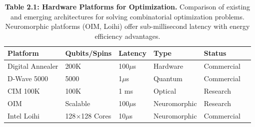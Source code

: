 \begin{table}[H]
\centering
\caption{\textbf{Table 2.1: Hardware Platforms for Optimization.} Comparison of existing and emerging architectures for solving combinatorial optimization problems. Neuromorphic platforms (OIM, Loihi) offer sub-millisecond latency with energy efficiency advantages.}
\label{tab:2-1}
\small
\begin{tabular}{llllll}
\toprule
\textbf{Platform} & \textbf{Qubits/Spins} & \textbf{Latency} & \textbf{Type} & \textbf{Status} \\
\midrule
\rowcolor{gray!15}
Digital Annealer & 200K & 100$\mu$s & Hardware & Commercial \\
D-Wave 5000 & 5000 & 1$\mu$s & Quantum & Commercial \\
\rowcolor{gray!15}
CIM 100K & 100K & 1 ms & Optical & Research \\
OIM & Scalable & 100$\mu$s & Neuromorphic & Research \\
\rowcolor{gray!15}
Intel Loihi & 128$\times$128 Cores & 10$\mu$s & Neuromorphic & Commercial \\
\bottomrule
\end{tabular}
\end{table}
